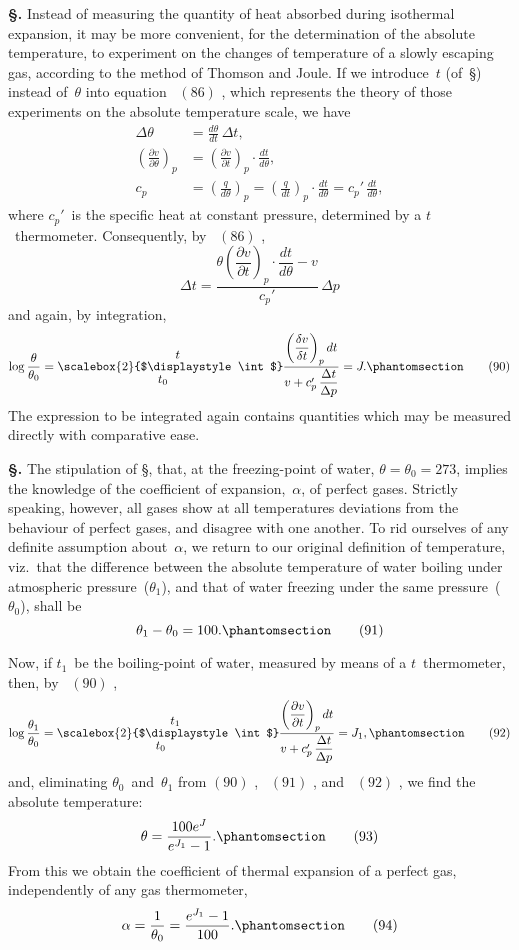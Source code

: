 \documentclass[12pt]{book}[2005/09/16]
\newcommand{\Chg}[2]{#2}
\newcommand{\Add}[1]{\Chg{}{#1}}
\newcommand{\Section}[1]{
  \medskip\par\textbf{§\;#1}
  \label{section:#1}
}
\newcommand{\SecRef}[2][§\;]{\hyperref[section:#2.]{{\upshape #1#2}}}
\newcommand{\Tag}[1]{%
  \phantomsection\label{eqn:#1}\tag*{\ensuremath{#1}}%
}
\newcommand{\Eq}[1]{%
  \hyperref[eqn:#1]{\ensuremath{#1}}%
}
\newcommand{\PageSep}[1]{\ignorespaces}
\newcommand{\dd}{\partial}
\newcommand{\EmRule}{\rule{12pt}{0pt}}
\newcommand{\Bigintlimits}[3][2]{%
  \mathop{\scalebox{#1}{$\displaystyle\int$}}\limits_{\mbox{$#2$\EmRule}}^{\mbox{\EmRule$#3$}}\kern-2pt%
}
\begin{document}
\Section{162.} Instead of measuring the quantity of heat absorbed
during isothermal expansion, it may be more convenient,
for the determination of the absolute temperature, to experiment
on the changes of temperature of a slowly escaping
gas, according to the method of Thomson and Joule. If we
introduce~$t$ (of~\SecRef{160}) instead of~$\theta$ into equation~\Eq{(86)}, which
represents the theory of those experiments on the absolute
temperature scale, we have
\begin{align*}
\Delta \theta &= \frac{d\theta}{dt}\, \Delta t\Add{,} \\
\left(\frac{\dd v}{\dd \theta}\right)_{p}
  &= \left(\frac{\dd v}{\dd t}\right)_{p} · \frac{dt}{d\theta}, \\
c_{p} &= \left(\frac{q}{d\theta}\right)_{p}
  = \left(\frac{q}{dt}\right)_{p} · \frac{dt}{d\theta}
  = c_{p}'\, \frac{dt}{d\theta},
\end{align*}
where $c_{p}'$~is the specific heat at constant pressure, determined
by a $t$~thermometer. Consequently, by~\Eq{(86)},
\[
\Delta t = \frac{\theta \left(\dfrac{\dd v}{\dd t}\right)_{p} · \dfrac{dt}{d\theta} - v}{c_{p}'}\, \Delta p
\]
and again, by integration,
\[
\log \frac{\theta}{\theta_{0}}
  = \Bigintlimits{t_{0}}{t} \frac{\left(\dfrac{\delta v}{\delta t}\right)_{p} dt}{v + c_{p}'\, \dfrac{\Delta t}{\Delta p}} = J.
\Tag{(90)}
\]
\PageSep{129}
The expression to be integrated again contains quantities
which may be measured directly with comparative ease.

\Section{163.} The stipulation of \SecRef{160}, that, at the freezing-point
of water, $\theta = \theta_{0}= 273$, implies the knowledge of the
coefficient of expansion,~$\alpha$, of perfect gases. Strictly speaking,
however, all gases show at all temperatures deviations
from the behaviour of perfect gases, and disagree with one
another. To rid ourselves of any definite assumption about~$\alpha$,
we return to our original definition of temperature, viz.\
that the difference between the absolute temperature of
water boiling under atmospheric pressure~($\theta_{1}$), and that of
water freezing under the same pressure~($\theta_{0}$), shall be
\[
\theta_{1} - \theta_{0} = 100\Add{.}
\Tag{(91)}
\]

Now, if $t_{1}$~be the boiling-point of water, measured by
means of a $t$~thermometer, then, by~\Eq{(90)},
\[
\log \frac{\theta_{1}}{\theta_{0}}
  = \Bigintlimits{t_{0}}{t_{1}} \frac{\left(\dfrac{\dd v}{\dd t}\right)_{p} dt}{v + c_{p}'\, \dfrac{\Delta t}{\Delta p}} = J_{1}\Add{,}
\Tag{(92)}
\]
and, eliminating $\theta_{0}$~and~$\theta_{1}$ from \Eq{(90)},~\Eq{(91)}, and~\Eq{(92)}, we find
the absolute temperature:
\[
\theta = \frac{100 e^{J}}{e^{J_{1}} - 1}.
\Tag{(93)}
\]
From this we obtain the coefficient of thermal expansion of
a perfect gas, independently of any gas thermometer,
\[
\alpha = \frac{1}{\theta_{0}} = \frac{e^{J_{1}} - 1}{100}.
\Tag{(94)}
\]
\end{document}
